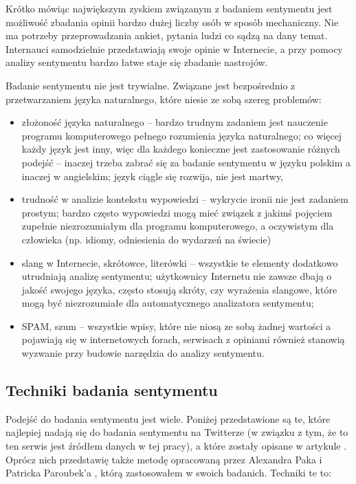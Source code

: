 Krótko mówiąc największym zyskiem związanym z badaniem sentymentu jest możliwość
zbadania opinii bardzo dużej liczby osób w sposób mechaniczny. Nie ma potrzeby
przeprowadzania ankiet, pytania ludzi co sądzą na dany temat. Internauci samodzielnie
przedstawiają swoje opinie w Internecie, a przy pomocy analizy sentymentu bardzo
łatwe staje się zbadanie nastrojów.


\clearpage

Badanie sentymentu nie jest trywialne. Związane jest bezpośrednio z 
przetwarzaniem języka naturalnego, które niesie ze sobą szereg problemów:

\begin{itemize}
  \item złożoność języka naturalnego -- bardzo trudnym zadaniem jest nauczenie 
programu komputerowego pełnego rozumienia języka naturalnego; co więcej każdy
język jest inny, więc dla każdego konieczne jest zastosowanie różnych
podejść -- inaczej trzeba zabrać się za badanie sentymentu w języku polskim
a inaczej w angielskim; język ciągle się rozwija, nie jest martwy,
\item trudność w analizie kontekstu wypowiedzi -- wykrycie ironii nie jest zadaniem 
prostym; bardzo często wypowiedzi mogą mieć związek z jakimś pojęciem 
zupełnie niezrozumiałym dla programu komputerowego, a oczywistym dla człowieka
(np. idiomy, odniesienia do wydarzeń na świecie)
\item slang w Internecie, skrótowce, literówki -- wszystkie te elementy
dodatkowo utrudniają analizę sentymentu; użytkownicy Internetu nie zawsze
dbają o jakość swojego języka, często stosują skróty, czy wyrażenia slangowe, 
które mogą być niezrozumiałe dla automatycznego analizatora sentymentu;
\item SPAM, szum -- wszystkie wpisy, które nie niosą ze sobą żadnej wartości
a pojawiają się w internetowych forach, serwisach z opiniami również stanowią
wyzwanie przy budowie narzędzia do analizy sentymentu.
\end{itemize}


\subsection{Techniki badania sentymentu}
Podejść do badania sentymentu jest wiele. Poniżej przedstawione są te, które
najlepiej nadają się do badania sentymentu na Twitterze (w związku z tym, że to
ten serwis jest źródłem danych w tej pracy), a które zostały opisane w artykule 
\cite{sentimentTechniques}. Oprócz nich przedstawię także metodę opracowaną
przez Alexandra Paka i Patricka Paroubek'a \cite{pakParoubekSentiment}, którą 
zastosowałem w swoich badanich. Techniki te to:

